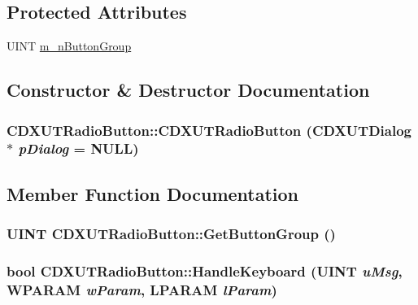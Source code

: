 \subsection*{Protected Attributes}
\begin{DoxyCompactItemize}
\item 
UINT \hyperlink{class_c_d_x_u_t_radio_button_a7d7389318e71e397b93666e7f0ca8664}{m\_\-nButtonGroup}
\end{DoxyCompactItemize}


\subsection{Constructor \& Destructor Documentation}
\hypertarget{class_c_d_x_u_t_radio_button_af6c3e04158bd02fd01c2328b951db366}{
\subsubsection[{CDXUTRadioButton}]{\setlength{\rightskip}{0pt plus 5cm}CDXUTRadioButton::CDXUTRadioButton ({\bf CDXUTDialog} $\ast$ {\em pDialog} = {\ttfamily NULL})}}
\label{class_c_d_x_u_t_radio_button_af6c3e04158bd02fd01c2328b951db366}


\subsection{Member Function Documentation}
\hypertarget{class_c_d_x_u_t_radio_button_a1b2f6d3405e49d94720ada2dda07dc20}{
\subsubsection[{GetButtonGroup}]{\setlength{\rightskip}{0pt plus 5cm}UINT CDXUTRadioButton::GetButtonGroup ()}}
\label{class_c_d_x_u_t_radio_button_a1b2f6d3405e49d94720ada2dda07dc20}
\hypertarget{class_c_d_x_u_t_radio_button_a221492c2a117d1faaab749c1f3a88a4d}{
\subsubsection[{HandleKeyboard}]{\setlength{\rightskip}{0pt plus 5cm}bool CDXUTRadioButton::HandleKeyboard (UINT {\em uMsg}, \/  WPARAM {\em wParam}, \/  LPARAM {\em lParam})}}
\label{class_c_d_x_u_t_radio_button_a221492c2a117d1faaab749c1f3a88a4d}


